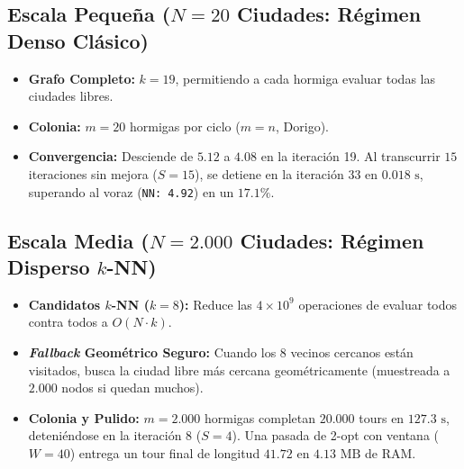 \documentclass[11pt,a4paper]{article}
\begin{document}
\subsection{Escala Pequeña (\texorpdfstring{$N = 20$}{N = 20} Ciudades: Régimen Denso Clásico)}
\begin{itemize}
    \item \textbf{Grafo Completo:} $k = 19$, permitiendo a cada hormiga evaluar todas las ciudades libres.
    \item \textbf{Colonia:} $m = 20$ hormigas por ciclo ($m=n$, Dorigo).
    \item \textbf{Convergencia:} Desciende de $5.12$ a $4.08$ en la iteración 19. Al transcurrir $15$ iteraciones sin mejora ($S=15$), se detiene en la iteración 33 en $0.018\text{ s}$, superando al voraz (\texttt{NN: 4.92}) en un $17.1\%$.
\end{itemize}

\subsection{Escala Media (\texorpdfstring{$N = 2.000$}{N = 2000} Ciudades: Régimen Disperso \texorpdfstring{$k$-NN}{k-NN})}
\begin{itemize}
    \item \textbf{Candidatos $k$-NN ($k=8$):} Reduce las $4 \times 10^9$ operaciones de evaluar todos contra todos a $O(N \cdot k)$.
    \item \textbf{\emph{Fallback} Geométrico Seguro:} Cuando los $8$ vecinos cercanos están visitados, busca la ciudad libre más cercana geométricamente (muestreada a $2.000$ nodos si quedan muchos).
    \item \textbf{Colonia y Pulido:} $m = 2.000$ hormigas completan $20.000$ tours en $127.3\text{ s}$, deteniéndose en la iteración 8 ($S=4$). Una pasada de 2-opt con ventana ($W=40$) entrega un tour final de longitud $41.72$ en $4.13\text{ MB}$ de RAM.
\end{itemize}
\end{document}
